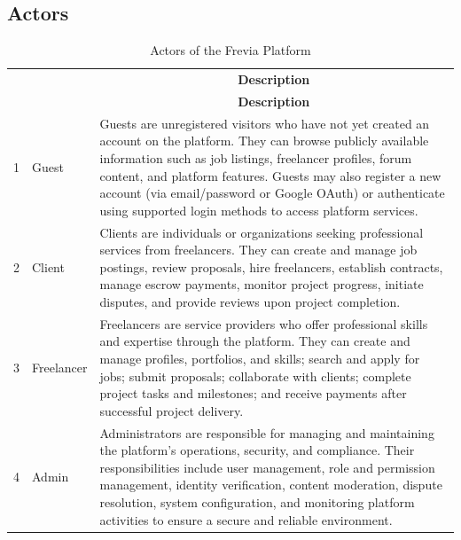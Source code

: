 \subsection{Actors}

\begingroup
\renewcommand{\arraystretch}{1.4}
\begin{longtable}{|c|>{\raggedright\arraybackslash}p{3.2cm}|p{10.5cm}|}
\caption{Actors of the Frevia Platform} \label{tab:actors} \\
\hhline{|-|-|-|}
\rowcolor{headerbg}
\multicolumn{1}{|c|}{\textbf{No}} &
\multicolumn{1}{c|}{\textbf{Actor}} &
\multicolumn{1}{c|}{\textbf{Description}} \\
\hhline{|-|-|-|}
\endfirsthead

\hhline{|-|-|-|}
\rowcolor{headerbg}
\multicolumn{1}{|c|}{\textbf{No}} &
\multicolumn{1}{c|}{\textbf{Actor}} &
\multicolumn{1}{c|}{\textbf{Description}} \\
\hhline{|-|-|-|}
\endhead

\hline
\endfoot

\hline
\endlastfoot

1 & Guest &
Guests are unregistered visitors who have not yet created an account on the platform. They can browse publicly available information such as job listings, freelancer profiles, forum content, and platform features. Guests may also register a new account (via email/password or Google OAuth) or authenticate using supported login methods to access platform services.
\\
\hline

2 & Client &
Clients are individuals or organizations seeking professional services from freelancers. They can create and manage job postings, review proposals, hire freelancers, establish contracts, manage escrow payments, monitor project progress, initiate disputes, and provide reviews upon project completion.
\\
\hline

3 & Freelancer &
Freelancers are service providers who offer professional skills and expertise through the platform. They can create and manage profiles, portfolios, and skills; search and apply for jobs; submit proposals; collaborate with clients; complete project tasks and milestones; and receive payments after successful project delivery.
\\
\hline

4 & Admin &
Administrators are responsible for managing and maintaining the platform's operations, security, and compliance. Their responsibilities include user management, role and permission management, identity verification, content moderation, dispute resolution, system configuration, and monitoring platform activities to ensure a secure and reliable environment.
\\
\hline


\end{longtable}
